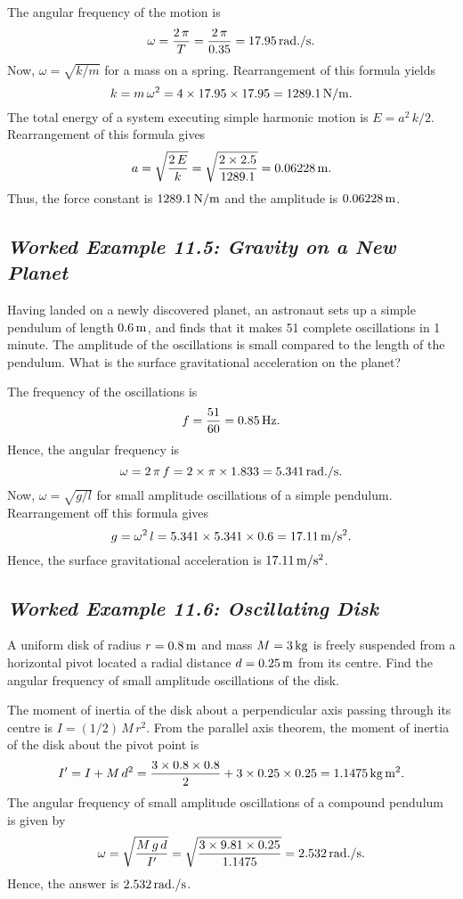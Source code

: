 The angular frequency of the motion is
$$
\omega = \frac{2\,\pi}{T} = \frac{2\,\pi}{0.35} = 17.95\,{\rm rad./s}.
$$
Now, $\omega=\sqrt{k/m}$ for a mass on a spring. Rearrangement of this formula yields
$$
k = m\,\omega^2 = 4 \times 17.95\times 17.95 = 1289.1\,{\rm N/m}.
$$
The total energy of a system executing simple harmonic motion is
$E= a^2\,k/2$. Rearrangement of this formula gives
$$
a = \sqrt{\frac{2\,E}{k}} = \sqrt{\frac{2\times 2.5}{1289.1}} = 0.06228\,{\rm m}.
$$
Thus, the force constant is $ 1289.1\,{\rm N/m}$ and the amplitude is $0.06228\,{\rm m}$. 

\subsection*{\em Worked Example 11.5: Gravity on a New Planet}
 Having landed on a newly discovered planet, an astronaut sets up 
a simple pendulum of length $0.6\,{\rm m}$, and finds that it makes 51 complete
oscillations in 1 minute. The amplitude of the oscillations is small compared to the
length of the pendulum. What is the surface gravitational acceleration on the planet?

 The frequency of the oscillations is
$$
f = \frac{51}{60}  = 0.85 \,{\rm Hz}.
$$
Hence, the angular frequency is
$$
\omega = 2\,\pi\,f = 2\times \pi\times 1.833 = 5.341\,{\rm rad./s}.
$$
Now, $\omega = \sqrt{g/l}$ for small amplitude oscillations of a simple pendulum. Rearrangement off this formula gives 
$$
g = \omega^2\,l = 5.341\times 5.341\times 0.6 = 17.11\,{\rm m/s^2}.
$$
Hence, the  surface gravitational acceleration is $17.11\,{\rm m/s^2}$.

\subsection*{\em Worked Example 11.6: Oscillating Disk}
 A uniform disk of radius $r = 0.8\,{\rm m}$ and mass $M = 3\,{\rm kg}$
is freely suspended from a horizontal pivot located a radial distance  $d=0.25\,{\rm m}$ from its centre.
Find the angular frequency of small amplitude oscillations of the disk. 

 The moment of inertia of the disk about a perpendicular axis passing through its
centre is $I= (1/2)\,M\,r^2$. From the parallel axis theorem, the moment of inertia of the disk
about the pivot point is
$$
I' = I + M\,d^2 = \frac{3\times 0.8\times 0.8}{2} + 3\times 0.25\times 0.25 = 1.1475\,{\rm kg\,m^2}.
$$
The angular frequency of small amplitude oscillations of a compound pendulum is given by
$$
\omega = \sqrt{\frac{M\,g\,d}{I'}} = \sqrt{\frac{3\times 9.81\times 0.25}{1.1475}} = 2.532\,{\rm rad./s}.
$$
Hence, the answer is $2.532\,{\rm rad./s}$.